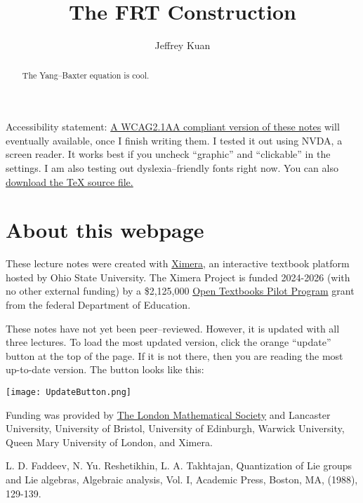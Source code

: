 \documentclass{ximera}
\author{Jeffrey Kuan}
\title{The FRT Construction}
\begin{document}
\begin{abstract}
   The Yang--Baxter equation is cool. 
\end{abstract}
\maketitle


Accessibility statement: \href{https://ximera.osu.edu/firststeps24html/aFirstStepInXimera/basics/RTT_Construction_WCAG}{A WCAG2.1AA compliant version of these notes} will eventually available, once I finish writing them. I tested it out using NVDA, a screen reader.
It works best if you uncheck ``graphic'' and ``clickable'' in the settings. I am also testing out dyslexia--friendly 
fonts right now. 
You can also \href{https://ximera.osu.edu/firststeps24html/aFirstStepInXimera/basics/RTT_Construction.tex}{download the TeX source file.}

\section{About this webpage}
These lecture notes were created with \href{https://ximera.osu.edu/}{Ximera}, an 
interactive textbook platform hosted by Ohio State University. The Ximera Project is funded 2024-2026 (with no other external funding) by a 
\$2,125,000 \href{https://www.ed.gov/grants-and-programs/grants-higher-education/improvement-postsecondary-education/open-textbooks-pilot-program}{Open Textbooks Pilot Program} grant from the federal Department of Education.

These notes have not yet been peer--reviewed. However, it is updated with all three lectures.
To load the most updated version, click the orange ``update'' button
at the top of the page. If it is not there, then you are reading the most up-to-date version. The button looks like this:

\texttt{[image: UpdateButton.png]}

Funding was provided by \href{https://www.lms.ac.uk/grants/visits-uk-scheme-2}{The London Mathematical Society} and 
Lancaster University, University of Bristol, University of Edinburgh, Warwick University, Queen Mary University of London, and Ximera. 






\begin{thebibliography}{10}

 L. D. Faddeev, N. Yu. Reshetikhin, L. A. Takhtajan, Quantization
of Lie groups and Lie algebras, Algebraic analysis, Vol. I, Academic
Press, Boston, MA, (1988), 129-139.

\end{thebibliography}
\end{document}
